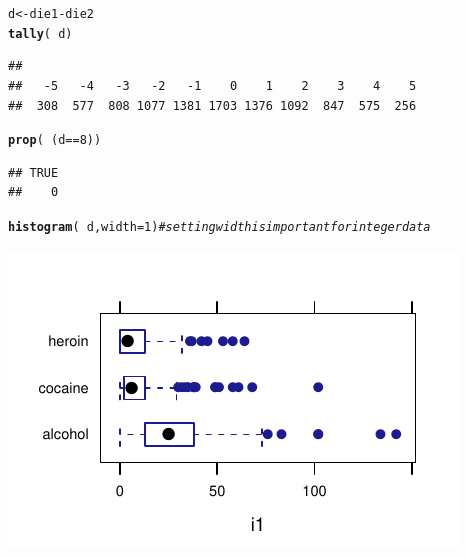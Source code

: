 \documentclass[twoside]{book}\usepackage[]{graphicx}\usepackage[]{xcolor}
\makeatletter
\def\maxwidth{ %
  \ifdim\Gin@nat@width>\linewidth
    \linewidth
  \else
    \Gin@nat@width
  \fi
}
\newcommand{\hlnum}[1]{\textcolor[rgb]{0.686,0.059,0.569}{#1}}%
\newcommand{\hlcom}[1]{\textcolor[rgb]{0.678,0.584,0.686}{\textit{#1}}}%
\newcommand{\hlopt}[1]{\textcolor[rgb]{0,0,0}{#1}}%
\newcommand{\hlstd}[1]{\textcolor[rgb]{0.345,0.345,0.345}{#1}}%
\newcommand{\hlkwb}[1]{\textcolor[rgb]{0.69,0.353,0.396}{#1}}%
\newcommand{\hlkwc}[1]{\textcolor[rgb]{0.333,0.667,0.333}{#1}}%
\newcommand{\hlkwd}[1]{\textcolor[rgb]{0.737,0.353,0.396}{\textbf{#1}}}%
\newenvironment{kframe}{%
 \def\at@end@of@kframe{}%
 \ifinner\ifhmode%
  \def\at@end@of@kframe{\end{minipage}}%
  \begin{minipage}{\columnwidth}%
 \fi\fi%
 \def\FrameCommand##1{\hskip\@totalleftmargin \hskip-\fboxsep
 \colorbox{shadecolor}{##1}\hskip-\fboxsep
     \hskip-\linewidth \hskip-\@totalleftmargin \hskip\columnwidth}%
 \MakeFramed {\advance\hsize-\width
   \@totalleftmargin\z@ \linewidth\hsize
   \@setminipage}}%
 {\par\unskip\endMakeFramed%
 \at@end@of@kframe}
\newenvironment{knitrout}{}{} %
\makeatother
\begin{document}
\begin{solution}
\begin{knitrout}
\color{fgcolor}\begin{kframe}
\begin{alltt}
\hlstd{d} \hlkwb{<-} \hlstd{die1} \hlopt{-} \hlstd{die2}
\hlkwd{tally}\hlstd{(}\hlopt{~}\hlstd{d)}
\end{alltt}
\begin{verbatim}
## 
##   -5   -4   -3   -2   -1    0    1    2    3    4    5 
##  308  577  808 1077 1381 1703 1376 1092  847  575  256
\end{verbatim}
\begin{alltt}
\hlkwd{prop}\hlstd{(}\hlopt{~}\hlstd{(d} \hlopt{==} \hlnum{8}\hlstd{))}
\end{alltt}


{\ttfamily\noindent\itshape\color{messagecolor}{\#\#\ \ \ \  target level: TRUE;\ \ other levels: FALSE}}\begin{verbatim}
## TRUE 
##    0
\end{verbatim}
\begin{alltt}
\hlkwd{histogram}\hlstd{(}\hlopt{~}\hlstd{d,} \hlkwc{width} \hlstd{=} \hlnum{1}\hlstd{)}  \hlcom{# setting width is important for integer data}
\end{alltt}
\end{kframe}

{\centering \includegraphics[width=\maxwidth]{figures/fig-unnamed-chunk-44-1} 

}



\end{knitrout}
\end{solution}
\end{document}
